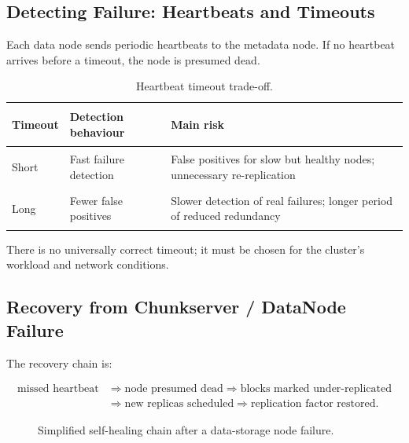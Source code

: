 \documentclass[11pt,a4paper,oneside]{book}
\begin{document}
\subsection{Detecting Failure: Heartbeats and Timeouts}

Each data node sends periodic heartbeats to the metadata node. If no heartbeat arrives before a timeout, the node is presumed dead.

\begin{table}[htbp]
\centering
\caption{Heartbeat timeout trade-off.}
\label{tab:timeout-tradeoff}
\begin{tabularx}{0.92\textwidth}{>{\bfseries\raggedright\arraybackslash}p{2.2cm} Y Y}
\toprule
{}
Timeout & Detection behaviour & Main risk \\
\midrule
Short & Fast failure detection & False positives for slow but healthy nodes; unnecessary re-replication \\
Long & Fewer false positives & Slower detection of real failures; longer period of reduced redundancy \\
\bottomrule
\end{tabularx}
\end{table}

There is no universally correct timeout; it must be chosen for the cluster's workload and network conditions.

\subsection{Recovery from Chunkserver / DataNode Failure}

The recovery chain is:

\[
\begin{aligned}
\text{missed heartbeat}
&\Longrightarrow \text{node presumed dead}
\Longrightarrow \text{blocks marked under-replicated} \\
&\Longrightarrow \text{new replicas scheduled}
\Longrightarrow \text{replication factor restored}.
\end{aligned}
\]

\begin{figure}[htbp]
\centering
{}
\caption{Simplified self-healing chain after a data-storage node failure.}
\label{fig:rereplication}
\end{figure}
\end{document}
